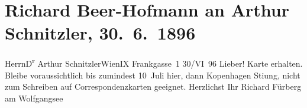 

         \renewcommand{\erwaehnteOrte}{Orte: Frankgasse 1, Fürberg, IX., Alsergrund, Kopenhagen, St. Gilgen, Wien}
         \renewcommand{\erwaehnteWerke}{}
               \section[Richard Beer-Hofmann an Arthur Schnitzler, 30. 6. 1896]{ Richard Beer-Hofmann an Arthur Schnitzler, 30. 6. 1896}\nopagebreak{}\rehead{ }\begin{ledgroupsized}[t]{13cm}\normalsize\beginnumbering \toendnotes[C]{\smallbreak\pagebreak[2]} 
\pstart{}{\pb}Herrn\pend{}\pstart{}D\textsuperscript{r} Arthur Schnitzler\pend{}\pstart{}Wien\pend{}\pstart{}IX Frankgasse 1\pend{}{\bigskip}\pstart
           \raggedleft{}{\pb}30/VI 96\pend
           \pstart
           Lieber! Karte erhalten. Bleibe voraussichtlich bis zumindest
                  10 Juli hier, dann Kopenhagen\pend
           \pstart
           Sti{\geminationm}ung, nicht zum Schreiben auf Correspondenzkarten
               geeignet. Herzlichst Ihr\pend
           \pstart \spacefill\mbox{Richard}\pend{}\pstart
           Fürberg am Wolfgangsee\pend
           
         
         \endnumbering{}\end{ledgroupsized}  \newcommand{\dateiname}{L00558}\newcommand{\titel}{Richard Beer-Hofmann an Arthur Schnitzler, 30. 6. 1896}\newcommand{\editorInnen}{Martin Anton Müller und Gerd-Hermann Susen}
      